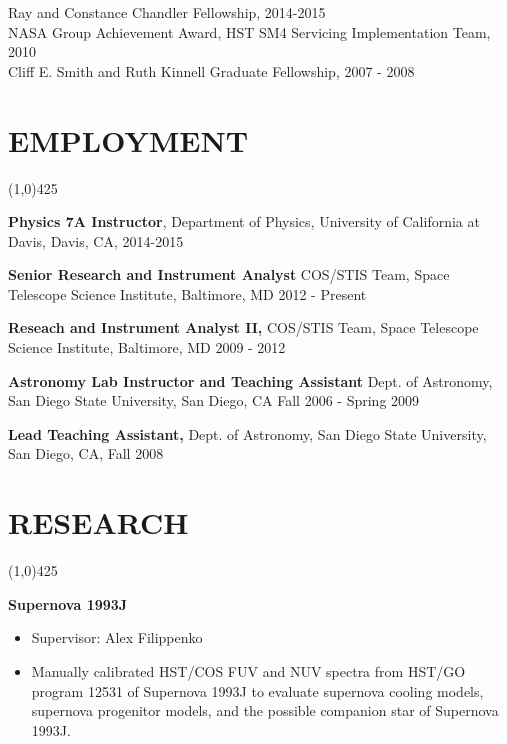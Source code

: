 \documentclass{res}
\begin{document}
\begin{resume}
Ray and Constance Chandler Fellowship, 2014-2015 \\
NASA Group Achievement Award, HST SM4 Servicing Implementation Team, 2010 \\
Cliff E. Smith and Ruth Kinnell Graduate Fellowship, 2007 - 2008 \\
 
\section{EMPLOYMENT}
\vspace{-.2in} 
\begin{center}
\line(1,0){425}
\end{center}
\vspace{-.3in} 
\vspace{0.1in} 
    {\bf Physics 7A Instructor}, Department of Physics, University of California at Davis, Davis, CA, 2014-2015

    {\bf Senior Research and Instrument Analyst} COS/STIS Team, Space Telescope Science Institute, Baltimore, MD
    2012 - Present

    {\bf Reseach and Instrument Analyst II,} COS/STIS Team, Space Telescope Science Institute, Baltimore, MD 
    2009 - 2012 
 
    {\bf Astronomy Lab Instructor and Teaching Assistant} Dept. of Astronomy, San Diego State University, San Diego, CA  Fall 2006 - Spring 2009 
 
    {\bf Lead Teaching Assistant,} Dept. of Astronomy, San Diego State University, San Diego, CA, Fall 2008
    
\newpage

\section{RESEARCH} 
\vspace{-.2in}
\begin{center}
\line(1,0){425}
\end{center}
\vspace{-.3in}
\vspace{0.1in}

   {\bf  Supernova 1993J}
          \begin{itemize}
   	\item[] Supervisor: Alex Filippenko

        \item[] Manually calibrated HST/COS FUV and NUV spectra from HST/GO program 12531 of Supernova 1993J to evaluate supernova cooling models, 
        supernova progenitor models, and the possible companion star of Supernova 1993J. 
        \end{itemize} 
 

\end{resume}
\end{document}
